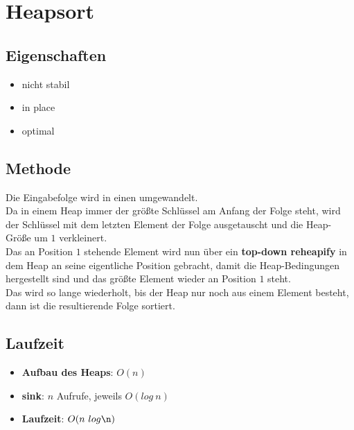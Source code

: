 \section{Heapsort}

\subsection{Eigenschaften}
\begin{itemize}
    \item nicht stabil
    \item in place
    \item optimal
\end{itemize}

\subsection{Methode}
Die Eingabefolge wird in einen  umgewandelt.\\
Da in einem Heap immer der größte Schlüssel am Anfang der Folge steht, wird der Schlüssel mit dem letzten Element der Folge ausgetauscht und die Heap-Größe um $1$ verkleinert.\\
Das an Position $1$ stehende Element wird nun über ein \textbf{top-down reheapify} in dem Heap an seine eigentliche Position gebracht, damit die Heap-Bedingungen hergestellt sind und das größte Element wieder an Position $1$ steht.\\
Das wird so lange wiederholt, bis der Heap nur noch aus einem Element besteht, dann ist die resultierende Folge sortiert.




\subsection{Laufzeit}
\begin{itemize}
    \item \textbf{Aufbau des Heaps}: $O(n)$
    \item \textbf{sink}: $n$ Aufrufe, jeweils $O(log\ n)$
    \item \textbf{Laufzeit}: $O(n\ log \n)$
\end{itemize}